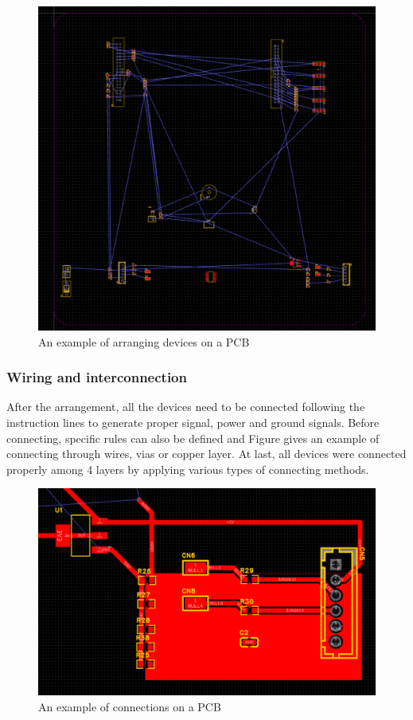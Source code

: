 \documentclass[12pt, a4paper, oneside]{report}
\begin{document}
\begin{figure}[!h]
	\centering
	\includegraphics[scale=0.43]{pic/PCB_figure/9_PCB.png}
	\caption{An example of arranging devices on a PCB}
    \label{fig:pcb9}
\end{figure}

\subsubsection{Wiring and interconnection}
After the arrangement, all the devices need to be connected following the instruction lines to generate proper signal, power and ground signals. Before connecting, specific rules can also be defined and Figure \label{fig:pcb10} gives an example of connecting through wires, vias or copper layer. At last, all devices were connected properly among 4 layers by applying various types of connecting methods.
\begin{figure}[!h]
	\centering
	\includegraphics[scale=0.28]{pic/PCB_figure/10_PCB.png}
	\caption{ An example of connections on a PCB}
    \label{fig:pcb10}
\end{figure}
\end{document}
